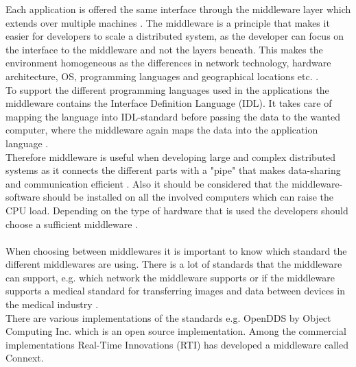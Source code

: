 \documentclass[Main]{subfiles}
\begin{document}
Each application is offered the same interface through the middleware layer which extends over multiple machines \cite[p. 3]{Tanenbaum}. The middleware is a principle that makes it easier for developers to scale a distributed system, as the developer can focus on the interface to the middleware and not the layers beneath. This makes the environment homogeneous as the differences in network technology, hardware architecture, OS, programming languages and geographical locations etc. \cite{DDS-slides} \cite[p. 68]{Coulouris}.
\\
To support the different programming languages used in the applications the middleware contains the Interface Definition Language (IDL). It takes care of mapping the language into IDL-standard before passing the data to the wanted computer, where the middleware again maps the data into the application language \cite{RTI}.
\\
Therefore middleware is useful when developing large and complex distributed systems as it connects the different parts with a "pipe" that makes data-sharing and communication efficient \cite{DDS-slides} \cite[p. 68]{Coulouris}. Also it should be considered that the middleware-software should be installed on all the involved computers which can raise the CPU load. Depending on the type of hardware that is used the developers should choose a sufficient middleware \cite{DDS-slides}.
\\
\\
When choosing between middlewares it is important to know which standard the different middlewares are using. There is a lot of standards that the middleware can support, e.g. which network the middleware supports or if the middleware supports a medical standard for transferring images and data between devices in the medical industry \cite{DDS_slides}.\\
There are various implementations of the standards e.g. OpenDDS by Object Computing Inc. which is an open source implementation. Among the commercial implementations Real-Time Innovations (RTI) has developed a middleware called Connext.
\end{document}
